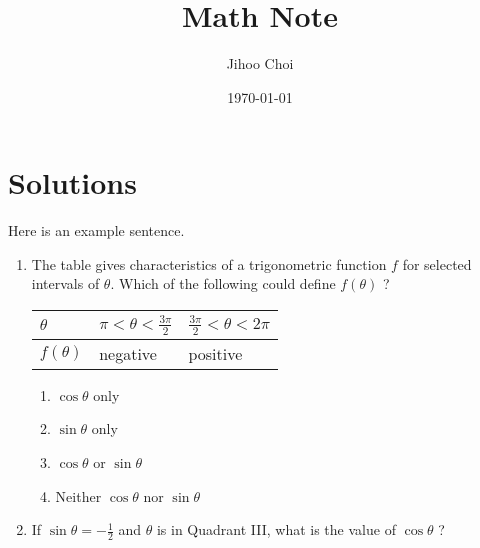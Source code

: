 \documentclass{article}
\author{Jihoo Choi}
\title{Math Note}
\date{\today}
\begin{document}
\maketitle

\section*{Solutions}

Here is an example sentence. 


\begin{enumerate}
  \item The table gives characteristics of a trigonometric function 
  $f$ for selected intervals of $\theta$. 
  Which of the following could define $f(\theta)$ ?
  \begin{center}
    \begin{tabular}{|l|l|l|}
    \hline$\theta$ & $\pi<\theta<\frac{3 \pi}{2}$ & $\frac{3 \pi}{2}<\theta<2 \pi$ \\
    \hline$f(\theta)$ & negative & positive \\
    \hline
    \end{tabular}
  \end{center}
  \begin{enumerate}
    \item $\cos \theta$ only
    \item $\sin \theta$ only
    \item $\cos \theta$ or $\sin \theta$
    \item Neither $\cos \theta$ nor $\sin \theta$
  \end{enumerate}


  \item If $\sin \theta=-\frac{1}{2}$ and $\theta$ is in Quadrant III, what is the value of $\cos \theta$ ?

\end{enumerate}
\end{document}
